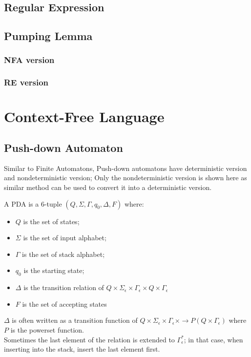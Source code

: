\documentclass{report}
\begin{document}
		\subsection{Regular Expression}
		
		\subsection{Pumping Lemma}
			\subsubsection{NFA version}
			
			\subsubsection{RE version}
	
	\section{Context-Free Language}
		\subsection{Push-down Automaton}
			Similar to Finite Automatons, Push-down automatons have deterministic version and nondeterministic version; Only the nondeterministic version is shown here as similar method can be used to convert it into a deterministic version.
			\begin{defn}
				A PDA is a 6-tuple $(Q,\Sigma,\Gamma,q_0,\Delta,F)$ where:
				\begin{itemize}
					\item $Q$ is the set of states;
					\item $\Sigma$ is the set of input alphabet;
					\item $\Gamma$ is the set of stack alphabet;
					\item $q_0$ is the starting state;
					\item $\Delta$ is the transition relation of $Q \times \Sigma_\epsilon \times \Gamma_\epsilon \times Q \times \Gamma_\epsilon$
					\item $F$ is the set of accepting states
				\end{itemize}
				$\Delta$ is often written as a transition function of $Q \times \Sigma_\epsilon \times \Gamma_\epsilon \times \rightarrow P(Q \times \Gamma_\epsilon)$ where $P$ is the powerset function.\\
				Sometimes the last element of the relation is extended to $\Gamma_\epsilon^*$; in that case, when inserting into the stack, insert the last element first.
			\end{defn}
		
\end{document}
